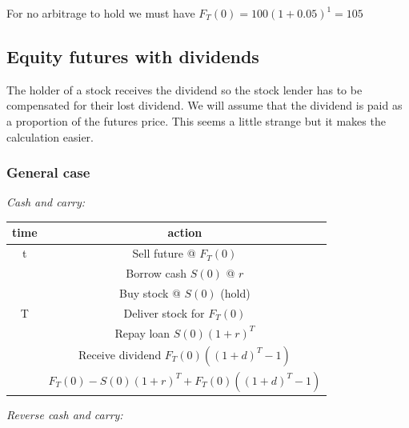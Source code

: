 For no arbitrage to hold we must have $F_{T}(0) = 100(1+0.05)^{1} = 105$

\subsection{Equity futures with dividends}

The holder of a stock receives the dividend so the stock lender has to be compensated for their lost dividend. We will assume that the dividend is paid as a proportion of the futures price. This seems a little strange but it makes the calculation easier.

\subsubsection{General case}

\textit{Cash and carry:}

\begin{tiny}
\begin{center} \begin{tabular}{|c|c|}
  \hline
  time & action \\
  \hline
  t & Sell future @ $F_T(0)$  \\
    & Borrow cash $S(0)$ @ $r$ \\
    & Buy stock @ $S(0)$ (hold) \\
  \hline
 T & Deliver stock for $F_T(0)$ \\
   & Repay loan $S(0)(1+r)^{T}$\\
   & Receive dividend $F_T(0)((1+d)^{T}-1)$\\
  \hline
   & $F_T(0) - S(0)(1+r)^{T} + F_T(0)((1+d)^{T}-1)$\\
  \hline
\end{tabular}\end{center}
\end{tiny}

\textit{Reverse cash and carry:}


